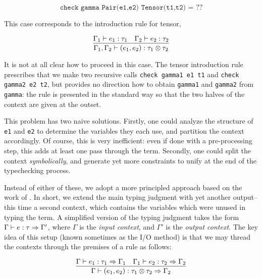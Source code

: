 $$
\texttt{check gamma Pair(e1,e2) Tensor(t1,t2) = } ??
$$

This case corresponds to the introduction rule for tensor,

$$
\infer{\Gamma_1,\Gamma_2 \vdash (e_1,e_2) : \tau_1 \otimes \tau_2}{\Gamma_1 \vdash e_1 : \tau_1 & \Gamma_2 \vdash e_2 : \tau_2}
$$


It is not at all clear how to proceed in this case. The tensor introduction rule prescribes that we make two recursive calls \texttt{check gamma1 e1 t1} and \texttt{check gamma2 e2 t2}, but provides no direction how to obtain \texttt{gamma1} and \texttt{gamma2} from \texttt{gamma}: the rule is presented in the standard way so that the two halves of the context are given at the outset.

This problem has two naive solutions. Firstly, one could analyze the structure of \texttt{e1} and \texttt{e2} to determine the variables they each use, and partition the context accordingly. Of course, this is very inefficient: even if done with a pre-processing step, this adds at least one pass through the term. Secondly, one could split the context \textit{symbolically}, and generate yet more constraints to unify at the end of the typechecking process.

Instead of either of these, we adopt a more principled approach based on the work of \citet{cervesato:tcs00}. In short, we extend the main typing judgment with yet another output-- this time a second context, which contains the variables which were unused in typing the term. A simplified version of the typing judgment takes the form $\Gamma \vdash e : \tau \Rightarrow \Gamma'$, where $\Gamma$ is the \textit{input context}, and $\Gamma'$ is the \textit{output context}. The key idea of this setup (known sometimes as the I/O method) is that we may thread the contexts through the premises of a rule as follows:

$$
\infer{\Gamma \vdash (e_1,e_2) : \tau_1 \otimes \tau_2 \gens \Gamma_2}{\Gamma \vdash e_1 : \tau_1 \gens \Gamma_1 & \Gamma_1 \vdash e_2 : \tau_2 \gens \Gamma_2}
$$


